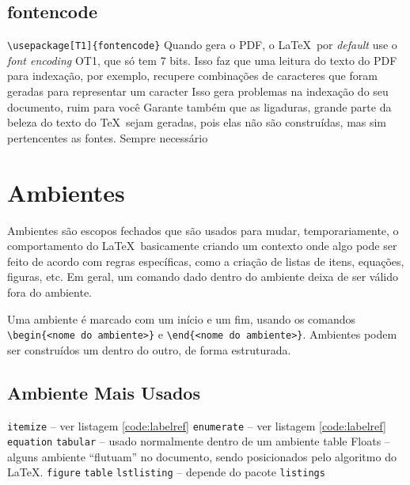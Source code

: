 \subsection{fontencode}
    \begin{outline}
        \1 \lstinline|\usepackage[T1]{fontencode}|
        \1 Quando gera o PDF, o \LaTeX\ por \textit{default} use o \textit{font encoding} OT1, que só tem 7 bits.
        \2 Isso faz que uma leitura do texto do PDF para indexação, por exemplo, recupere combinações de caracteres que foram geradas para representar um caracter
        \3 Isso gera problemas na indexação do seu documento, ruim para você
        \1 Garante também que as ligaduras, grande parte da beleza do texto do \TeX\ sejam geradas, pois elas não são construídas, mas sim pertencentes as fontes.
        \1 Sempre necessário
    \end{outline}

\section{Ambientes}

   Ambientes são escopos fechados que são usados para mudar, temporariamente, o comportamento do \LaTeX\, basicamente criando um  contexto onde algo pode ser feito de acordo com
   regras específicas, como a criação de listas de itens,
   equações, figuras, etc.  Em geral, um comando dado dentro do ambiente deixa de ser válido fora do ambiente.
   
   
   Uma ambiente é marcado com um início e um fim, usando os
   comandos \lstinline|\begin{<nome do ambiente>}| e 
   \lstinline|\end{<nome do ambiente>}|. Ambientes podem
   ser construídos um dentro do outro, de forma estruturada.


\subsection{Ambiente Mais Usados}
\begin{outline}
    \1 \lstinline|itemize| -- ver listagem \ref{code:labelref}
    \1 \lstinline|enumerate| -- ver listagem \ref{code:labelref}
    \1 \lstinline|equation|
    \1 \lstinline|tabular|  -- usado normalmente dentro de um ambiente table
    \1 Floats -- alguns ambiente ``flutuam'' no documento,
    sendo posicionados pelo algoritmo do \LaTeX. 
    \2 \lstinline|figure|
    \2 \lstinline|table|
    \2 \lstinline|lstlisting| -- depende do pacote \lstinline|listings|
\end{outline}

